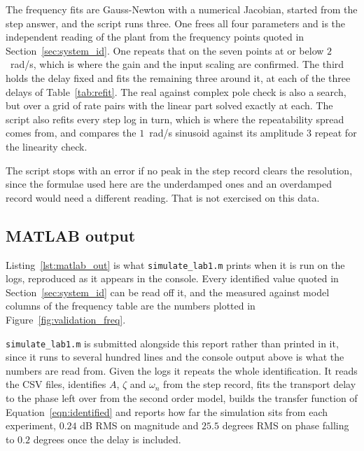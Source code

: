 The frequency fits are Gauss-Newton with a numerical Jacobian, started from the step answer,
and the script runs three. One frees all four parameters and is the independent reading of the
plant from the frequency points quoted in Section~\ref{sec:system_id}. One repeats that on the
seven points at or below $2$~rad/s, which is where the gain and the input scaling are
confirmed. The third holds the delay fixed and fits the remaining three around it, at each of
the three delays of Table~\ref{tab:refit}. The real against complex pole check is also a search,
but over a grid of rate pairs with the linear part solved exactly at each. The script also refits every step log in turn, which
is where the repeatability spread comes from, and compares the $1$~rad/s sinusoid against its
amplitude $3$ repeat for the linearity check.

The script stops with an error if no peak in the step record clears the resolution, since the
formulae used here are the underdamped ones and an overdamped record would need a different
reading. That is not exercised on this data.

\subsection{MATLAB output}

Listing~\ref{lst:matlab_out} is what \texttt{simulate\_lab1.m} prints when it is run on the
logs, reproduced as it appears in the console. Every identified value quoted in
Section~\ref{sec:system_id} can be read off it, and the measured against model columns of the
frequency table are the numbers plotted in Figure~\ref{fig:validation_freq}.



\texttt{simulate\_lab1.m} is submitted alongside this report rather than printed in it, since
it runs to several hundred lines and the console output above is what the numbers are read
from. Given the logs it repeats the whole identification. It reads the CSV files, identifies
$A$, $\zeta$ and $\omega_n$ from the step record, fits the transport delay to the phase left
over from the second order model, builds the transfer function of Equation~\ref{eqn:identified}
and reports how far the simulation sits from each experiment, $0.24$ dB RMS on magnitude and
$25.5$ degrees RMS on phase falling to $0.2$ degrees once the delay is included.


